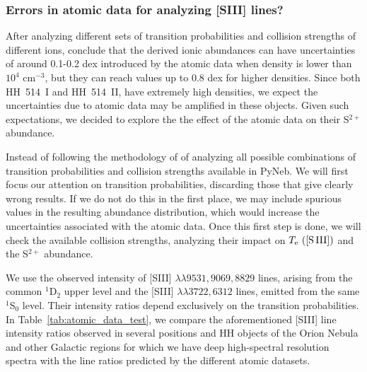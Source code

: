 \documentclass[fleqn,usenatbib]{mnras}
\begin{document}
\subsubsection{Errors in    atomic data for analyzing [S\thinspace III] lines?}
\label{subsec:atomic_data}

After analyzing different sets of transition probabilities and collision strengths of different ions, \citet{Juan-de-Dios17} conclude that the derived ionic abundances can have uncertainties of around 0.1-0.2 dex introduced by the atomic data when density is lower than $10^4$ cm$^{-3}$, but they can reach values up to 0.8 dex for higher densities. Since both HH~514~I and HH~514~II, have extremely high densities, we expect the uncertainties due to atomic data may be amplified in these objects. Given such expectations, we decided to explore the the effect of the atomic data on their  S$^{2+}$ abundance.

Instead of following the methodology of  \citet{Juan-de-Dios17} of analyzing all possible combinations of transition probabilities and collision strengths available in PyNeb. We will first focus our attention on transition probabilities, discarding those that give clearly wrong results. If we do not do this in the first place, we may include spurious values in the resulting abundance distribution, which would increase the uncertainties associated with the atomic data. Once this first step is done, we will check the available collision strengths, analyzing their impact on $T_{\rm e} \text{ ([S\thinspace III])}$ and the S$^{2+}$ abundance.


We use the observed intensity of [S\thinspace III] $\lambda \lambda 9531, 9069, 8829$ lines, arising from the common $^1$D$_2$ upper level and the [S\thinspace III] $\lambda \lambda 3722, 6312$ lines, emitted from the same $^1$S$_0$ level. Their intensity ratios depend exclusively on the transition probabilities. In Table~\ref{tab:atomic_data_test}, we compare the aforementioned [S\thinspace III] line intensity ratios observed in several positions and HH objects of the Orion Nebula and other Galactic {\hii} regions for which we have deep high-spectral resolution spectra with the line ratios predicted by the different atomic datasets.    
\end{document}
